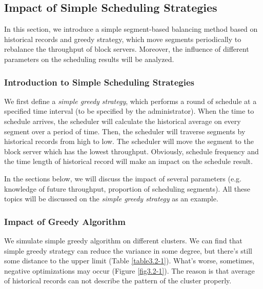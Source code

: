 \subsection{Impact of Simple Scheduling Strategies}
\label{sec3.2-0}

In this section, we introduce a simple segment-based balancing method based on historical records and greedy strategy, which move segments periodically to rebalance the throughput of block servers. Moreover, the influence of different parameters on the scheduling results will be analyzed.

\subsubsection{Introduction to Simple Scheduling Strategies} 
\label{sec3.2-1}

We first define a \textit{simple greedy strategy}, which performs a round of schedule at a specified time interval (to be specified by the administrator). When the time to schedule arrives, the scheduler will calculate the historical average on every segment over a period of time. Then, the scheduler will traverse segments by historical records from high to low. The scheduler will move the segment to the block server which has the lowest throughput. Obviously, schedule frequency and the time length of historical record will make an impact on the schedule result.

In the sections below, we will discuss the impact of several parameters (e.g. knowledge of future throughput, proportion of scheduling segments). All these topics will be discussed on the \textit{simple greedy strategy} as an example.


\subsubsection{Impact of Greedy Algorithm}
\label{sec3.2-2}

We simulate simple greedy algorithm on different clusters. We can find that simple greedy strategy can reduce the variance in some degree, but there's still some distance to the upper limit (Table \ref{table3.2-1}). What's worse, sometimes, negative optimizations may occur (Figure \ref{fig3.2-1}). The reason is that average of historical records can not describe the pattern of the cluster properly. 

